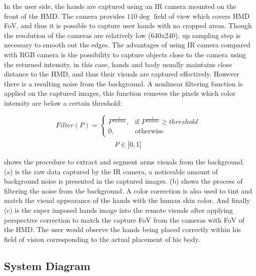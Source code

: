 In the user side, the hands are captured using an IR camera mounted on the front of the HMD. The camera provides $110\deg$ field of view which covers HMD FoV, and thus it is possible to capture user hands with no cropped areas. Though the resolution of the cameras are relatively low (640x240), up sampling step is necessary to smooth out the edges. The advantages of using IR camera compared with RGB camera is the possibility to capture objects close to the camera using the returned intensity, in this case, hands and body usually maintains close distance to the HMD, and thus their visuals are captured effectively. However there is a resulting noise from the background. A nonlinear filtering function is applied on the captured images, this function removes the pixels which color intensity are below a certain threshold:

\begin{equation}
\label{eq:hands_correction}
Filter(P)=
\begin{cases}
    P^{\frac{1}{Gamma}}, & \text{if } P^{\frac{1}{Gamma}} \geq threshold \\
    0,                  & \text{otherwise}
\end{cases} 
\end{equation}
\[
 \emph{P}\in\left [ 0,1 \right ] 
\]


 shows the procedure to extract and segment arms visuals from the background. (a) is the raw data captured by the IR camera, a noticeable amount of background noise is presented in the captured images. (b) shows the process of filtering the noise from the background. A color correction is also used to tint and match the visual appearance of the hands with the human skin color. And finally (c) is the super imposed hands image into the remote visuals after applying perspective correction to match the capture FoV from the cameras with FoV of the HMD. The user would observe the hands being placed correctly within his field of vision corresponding to the actual placement of his body.



\subsection{System Diagram}


